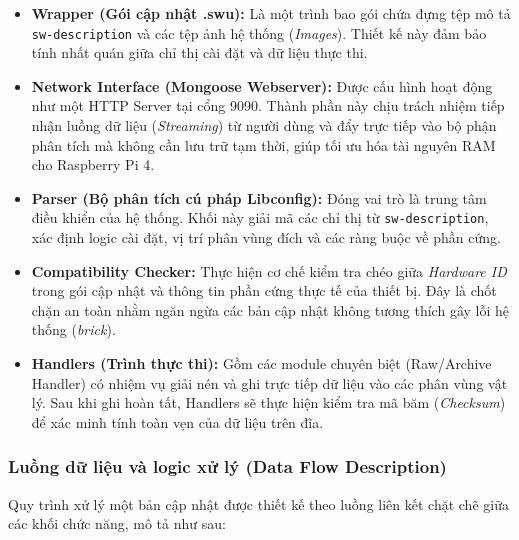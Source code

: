 \begin{itemize}
    \item \textbf{Wrapper (Gói cập nhật .swu):} Là một trình bao gói chứa đựng tệp mô tả \texttt{sw-description} và các tệp ảnh hệ thống (\textit{Images}). Thiết kế này đảm bảo tính nhất quán giữa chỉ thị cài đặt và dữ liệu thực thi.

    \item \textbf{Network Interface (Mongoose Webserver):} Được cấu hình hoạt động như một HTTP Server tại cổng 9090. Thành phần này chịu trách nhiệm tiếp nhận luồng dữ liệu (\textit{Streaming}) từ người dùng và đẩy trực tiếp vào bộ phận phân tích mà không cần lưu trữ tạm thời, giúp tối ưu hóa tài nguyên RAM cho Raspberry Pi 4.

    \item \textbf{Parser (Bộ phân tích cú pháp Libconfig):} Đóng vai trò là trung tâm điều khiển của hệ thống. Khối này giải mã các chỉ thị từ \texttt{sw-description}, xác định logic cài đặt, vị trí phân vùng đích và các ràng buộc về phần cứng.

    \item \textbf{Compatibility Checker:} Thực hiện cơ chế kiểm tra chéo giữa \textit{Hardware ID} trong gói cập nhật và thông tin phần cứng thực tế của thiết bị. Đây là chốt chặn an toàn nhằm ngăn ngừa các bản cập nhật không tương thích gây lỗi hệ thống (\textit{brick}).

    \item \textbf{Handlers (Trình thực thi):} Gồm các module chuyên biệt (Raw/Archive Handler) có nhiệm vụ giải nén và ghi trực tiếp dữ liệu vào các phân vùng vật lý. Sau khi ghi hoàn tất, Handlers sẽ thực hiện kiểm tra mã băm (\textit{Checksum}) để xác minh tính toàn vẹn của dữ liệu trên đĩa.
\end{itemize}

\subsubsection{Luồng dữ liệu và logic xử lý (Data Flow Description)}

Quy trình xử lý một bản cập nhật được thiết kế theo luồng liên kết chặt chẽ giữa các khối chức năng, mô tả như sau:

